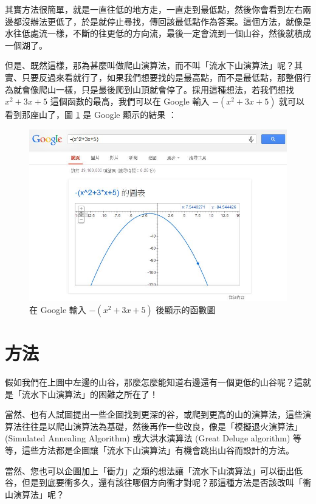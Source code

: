 \documentclass{article}
\begin{document}
其實方法很簡單，就是一直往低的地方走，一直走到最低點，然後你會看到左右兩邊都沒辦法更低了，於是就停止尋找，傳回該最低點作為答案。這個方法，就像是水往低處流一樣，不斷的往更低的方向流，最後一定會流到一個山谷，然後就積成一個湖了。

但是、既然這樣，那為甚麼叫做爬山演算法，而不叫「流水下山演算法」呢？其 實、只要反過來看就行了，如果我們想要找的是最高點，而不是最低點，那整個行為就會像爬山一樣，只是最後爬到山頂就會停了。採用這種想法，若我們想找 $x^2+3x+5$ 這個函數的最高，我們可以在 Google 輸入  $-(x^2+3x+5)$  就可以看到那座山了，圖  \ref{fig:curve2} 是 Google 顯示的結果  ：

\begin{figure}
  \includegraphics[width=\linewidth]{img/GoogleGraph2DMountain.jpg}
  \caption{在 Google 輸入 $-(x^2+3x+5)$ 後顯示的函數圖}
  \label{fig:curve2}
\end{figure}

\section{方法}


假如我們在上圖中左邊的山谷，那麼怎麼能知道右邊還有一個更低的山谷呢？這就是「流水下山演算法」的困難之所在了！

當然、也有人試圖提出一些企圖找到更深的谷，或爬到更高的山的演算法，這些演算法往往是以爬山演算法為基礎，然後再作一些改良，像是「模擬退火演算法」(Simulated Annealing Algorithm) 或大洪水演算法 (Great Deluge algorithm) 等等，這些方法都是企圖讓「流水下山演算法」有機會跳出山谷而設計的方法。

當然、您也可以企圖加上「衝力」之類的想法讓「流水下山演算法」可以衝出低谷，但是到底要衝多久，還有該往哪個方向衝才對呢？那這種方法是否該改叫「衝山演算法」呢？
\end{document}
